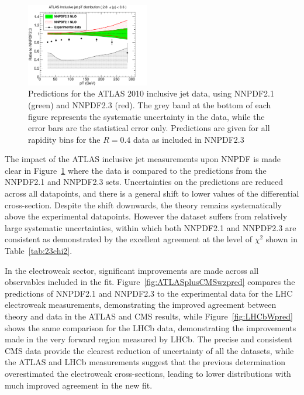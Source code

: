 \begin{figure}[hp]
\includegraphics[width=0.48\textwidth]{6-LHCimpact/figs/ATLASR04JETS36PB_5.pdf}
\caption[Predictions for the ATLAS 2010 inclusive jet data, using NNPDF2.1 and NNPDF2.3]{Predictions for the ATLAS 2010 inclusive jet data, using NNPDF2.1 (green) and NNPDF2.3 (red). The grey band at the bottom of each figure represents the systematic uncertainty in the data, while the error bars are the statistical error only. Predictions are given for all rapidity bins for the $R=0.4$ data as included in NNPDF2.3}
\label{fig:ATLASjetspred}
\end{figure}

The impact of the ATLAS inclusive jet measurements upon NNPDF is made clear in Figure~\ref{fig:ATLASjetspred} where the data is compared to the predictions from the NNPDF2.1 and NNPDF2.3 sets. Uncertainties on the predictions are reduced across all datapoints, and there is a general shift to lower values of the differential cross-section. Despite the shift downwards, the theory remains systematically above the experimental datapoints. However the dataset suffers from relatively large systematic uncertainties, within which both NNPDF2.1 and NNPDF2.3 are consistent as demonstrated by the excellent agreement at the level of $\chi^2$ shown in Table~\ref{tab:23chi2}.

In the electroweak sector, significant improvements are made across all observables included in the fit. Figure~\ref{fig:ATLASplusCMSwzpred} compares the predictions of NNPDF2.1 and NNPDF2.3 to the experimental data for the LHC electroweak measurements, demonstrating the improved agreement between theory and data in the ATLAS and CMS results, while Figure~\ref{fig:LHCbWpred} shows the same comparison for the LHCb data, demonstrating the improvements made in the very forward region measured by LHCb. The precise and consistent CMS data provide the clearest reduction of uncertainty of all the datasets, while the ATLAS and LHCb measurements suggest that the previous determination overestimated the electroweak cross-sections, leading to lower distributions with much improved agreement in the new fit.

